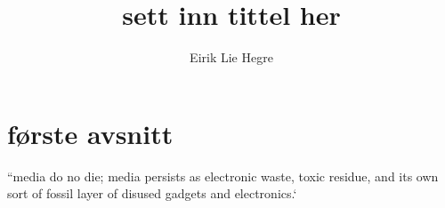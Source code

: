 \documentclass[12pt, letterpaper]{article}
\title{sett inn tittel her}
\author{Eirik Lie Hegre}
\begin{document}
\maketitle

\tableofcontents

\section{første avsnitt}

\textcite{parikkahertz15} ``media do no die; media persists as electronic waste,
toxic residue, and its own sort of fossil layer of disused gadgets and
electronics.`

\printbibliography{}
\end{document}
